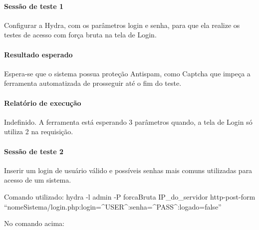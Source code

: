 \documentclass[
    12pt,               %
    openright,          %
    oneside,            %
    a4paper,            %
    section=TITLE,     %
    english,            %
    french,             %
    spanish,            %
    brazil              %
    ]{abntex2}
\begin{document}
\paragraph*{Sessão de teste 1}

Configurar a Hydra, com os parâmetros login e senha, para que ela realize os testes de acesso com força bruta na tela de Login.



\paragraph*{Resultado esperado}

Espera-se que o sistema possua proteção Antispam, como Captcha que impeça a ferramenta automatizada de prosseguir até o fim do teste.



\paragraph*{Relatório de execução}

Indefinido. A ferramenta está esperando 3 parâmetros quando, a tela de Login só utiliza 2 na requisição.



\paragraph*{Sessão de teste 2}

Inserir um login de usuário válido e possíveis senhas mais comuns utilizadas para acesso de um sistema.


Comando utilizado: hydra -l admin -P forcaBruta IP\_do\_servidor http-post-form \textquotedblleft{}nomeSistema/login.php:login=\^{}USER\^{}:senha=\^{}PASS\^{}:logado=false\textquotedblright{}


No comando acima:
\end{document}
